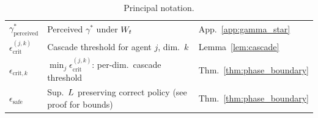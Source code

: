 \begin{table}[h]
\begin{tabular}{@{}lll@{}}
$\gamma^*_{\mathrm{perceived}}$ & Perceived $\gamma^*$ under $W_t$ & App.\ \ref{app:gamma_star} \\
$\epsilon_{\mathrm{crit}}^{(j,k)}$ & Cascade threshold for agent $j$, dim.\ $k$ & Lemma~\ref{lem:cascade} \\
$\epsilon_{\mathrm{crit},k}$ & $\min_j \epsilon_{\mathrm{crit}}^{(j,k)}$: per-dim.\ cascade threshold & Thm.\ \ref{thm:phase_boundary} \\
$\epsilon_{\mathrm{safe}}$ & Sup.\ $L$ preserving correct policy (see proof for bounds) & Thm.\ \ref{thm:phase_boundary} \\
\bottomrule
\end{tabular}
\caption{Principal notation.}
\label{tab:notation}
\end{table}
